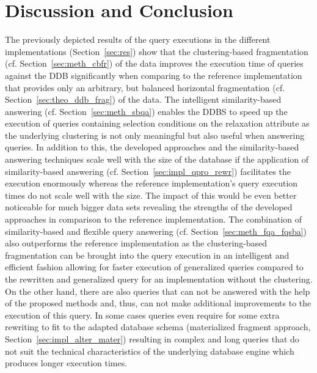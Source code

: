 
\section{Discussion and Conclusion}
\label{sec:disc}

The previously depicted results of the query executions in the different implementations (Section~\ref{sec:res}) show that the clustering-based fragmentation 
(cf. Section~\ref{sec:meth_cbfr}) of the data improves the execution time of queries against the DDB significantly when comparing to the reference implementation 
that provides only an arbitrary, but balanced horizontal fragmentation (cf. Section~\ref{sec:theo_ddb_frag}) of the data. The intelligent similarity-based answering
(cf. Section~\ref{sec:meth_sbqa}) enables the DDBS to speed up the execution of queries containing selection conditions on the relaxation attribute as the underlying
clustering is not only meaningful but also useful when answering queries. In addition to this, the developed approaches and the similarity-based answering techniques
scale well with the size of the database if the application of similarity-based answering (cf. Section~\ref{sec:impl_qpro_rewr}) facilitates the execution enormously
whereas the reference implementation's
query execution times do not scale well with the size. The impact of this would be even better noticeable for much bigger data sets revealing the strengths of the
developed approaches in comparison to the reference implementation. The combination of similarity-based and flexible query answering 
(cf. Section~\ref{sec:meth_fqa_fqsba}) also outperforms the reference implementation as the clustering-based fragmentation can be brought into the query execution 
in an intelligent and efficient fashion allowing for faster execution of generalized queries compared to the rewritten and generalized query for an implementation
without the clustering. On the other hand, there are also queries that can not be answered with the help of the proposed methods and, thus, can not make additional
improvements to the execution of this query. In some cases queries even require for some extra rewriting to fit to the adapted database schema (materialized
fragment approach, Section~\ref{sec:impl_alter_mater}) resulting in complex and long queries that do not suit the technical characteristics of the underlying 
database engine which produces longer execution times.

